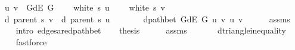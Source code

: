 \begin{isabellebody}
\ \ \ {\isachardoublequoteopen}{\isacharparenleft}{\kern0pt}u{\isacharcomma}{\kern0pt}\ v{\isacharparenright}{\kern0pt}\ {\isasymin}\ G{\isachardot}{\kern0pt}dE\ G{\isachardoublequoteclose}\isanewline
\ \ \ {\isachardoublequoteopen}{\isasymnot}\ white\ s\ u{\isachardoublequoteclose}\isanewline
\ \ \ {\isachardoublequoteopen}{\isasymnot}\ white\ s\ v{\isachardoublequoteclose}\isanewline
\ \ \ {\isachardoublequoteopen}d\ {\isacharparenleft}{\kern0pt}parent\ s{\isacharparenright}{\kern0pt}\ v\ {\isasymle}\ d\ {\isacharparenleft}{\kern0pt}parent\ s{\isacharparenright}{\kern0pt}\ u\ {\isacharplus}{\kern0pt}\ {}{\isachardoublequoteclose}\isanewline
%
\isadelimproof
%
\endisadelimproof
%
\isatagproof
{}\isamarkupfalse%
\ {\isacharminus}{\kern0pt}\isanewline
\ \ \isamarkupfalse%
\ {\isachardoublequoteopen}dpath{\isacharunderscore}{\kern0pt}bet\ {\isacharparenleft}{\kern0pt}G{\isachardot}{\kern0pt}dE\ G{\isacharparenright}{\kern0pt}\ {\isacharbrackleft}{\kern0pt}u{\isacharcomma}{\kern0pt}\ v{\isacharbrackright}{\kern0pt}\ u\ v{\isachardoublequoteclose}\isanewline
\ \ \ \ \isamarkupfalse%
\ assms{\isacharparenleft}{\kern0pt}{}{\isacharparenright}{\kern0pt}\isanewline
\ \ \ \ \isamarkupfalse%
\ {\isacharparenleft}{\kern0pt}intro\ edges{\isacharunderscore}{\kern0pt}are{\isacharunderscore}{\kern0pt}dpath{\isacharunderscore}{\kern0pt}bet{\isacharparenright}{\kern0pt}\isanewline
\ \ \isamarkupfalse%
\ {\isacharquery}{\kern0pt}thesis\isanewline
\ \ \ \ \isamarkupfalse%
\ assms{\isacharparenleft}{\kern0pt}{}{\isacharcomma}{\kern0pt}\ {}{\isacharparenright}{\kern0pt}\isanewline
\ \ \ \ \isamarkupfalse%
\ d{\isacharunderscore}{\kern0pt}triangle{\isacharunderscore}{\kern0pt}inequality\isanewline
\ \ \ \ \isamarkupfalse%
\ fastforce\isanewline
{}\isamarkupfalse%
%
\endisatagproof
{\isafoldproof}%
%
\isadelimproof
%
\endisadelimproof
%
\isadelimdocument
%
\endisadelimdocument
%
\isatagdocument
%
\isamarkuptrue%
%
\isamarkupsubsubsection{%
}
\isamarkuptrue%
%
\isamarkupsubsubsection{%
}
\isamarkuptrue%
%

\end{isabellebody}
